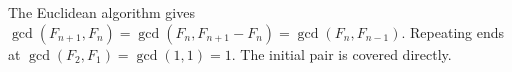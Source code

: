 The Euclidean algorithm gives $\gcd(F_{n+1},F_n)=\gcd(F_n,F_{n+1}-F_n)=\gcd(F_n,F_{n-1})$. Repeating ends at $\gcd(F_2,F_1)=\gcd(1,1)=1$. The initial pair is covered directly.

